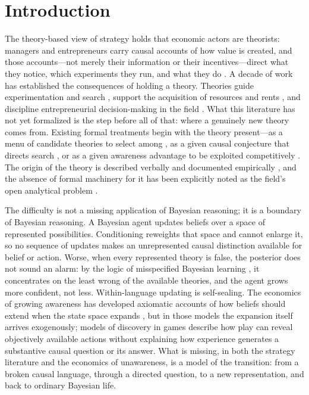 \documentclass[11pt]{article}
\theoremstyle{definition}
\begin{document}
\section{Introduction}
\label{sec:intro}

The theory-based view of strategy holds that economic actors are theorists: managers and entrepreneurs carry causal accounts of how value is created, and those accounts---not merely their information or their incentives---direct what they notice, which experiments they run, and what they do \citep{FelinZenger2017,FelinGambardellaZenger2024}.
A decade of work has established the consequences of holding a theory.
Theories guide experimentation and search \citep{CamuffoEtAl2020,ChavdaGansStern2024}, support the acquisition of resources and rents \citep{EhrigZenger2024}, and discipline entrepreneurial decision-making in the field \citep{CamuffoEtAl2024}.
What this literature has not yet formalized is the step before all of that: where a genuinely new theory comes from.
Existing formal treatments begin with the theory present---as a menu of candidate theories to select among \citep{CamuffoEtAl2024}, as a given causal conjecture that directs search \citep{ChavdaGansStern2024}, or as a given awareness advantage to be exploited competitively \citep{EhrigZenger2024}.
The origin of the theory is described verbally and documented empirically \citep{OttHannah2024}, and the absence of formal machinery for it has been explicitly noted as the field's open analytical problem \citep{FelinGambardellaZenger2024}.

The difficulty is not a missing application of Bayesian reasoning; it is a boundary of Bayesian reasoning.
A Bayesian agent updates beliefs over a space of represented possibilities.
Conditioning reweights that space and cannot enlarge it, so no sequence of updates makes an unrepresented causal distinction available for belief or action.
Worse, when every represented theory is false, the posterior does not sound an alarm: by the logic of misspecified Bayesian learning \citep{Berk1966}, it concentrates on the least wrong of the available theories, and the agent grows more confident, not less.
Within-language updating is self-sealing.
The economics of growing awareness has developed axiomatic accounts of how beliefs should extend when the state space expands \citep{KarniViero2013,KarniViero2017,Viero2021}, but in those models the expansion itself arrives exogenously; models of discovery in games describe how play can reveal objectively available actions \citep{Schipper2021} without explaining how experience generates a substantive causal question or its answer.
What is missing, in both the strategy literature and the economics of unawareness, is a model of the transition: from a broken causal language, through a directed question, to a new representation, and back to ordinary Bayesian life.
\end{document}
